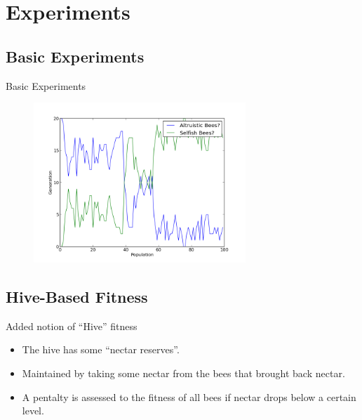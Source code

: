 \documentclass{beamer}
\begin{document}
    \section{Experiments}

    \subsection{Basic Experiments}

    \begin{frame}{Basic Experiments}
        \begin{figure}
            
        \includegraphics[width=8cm]{s_bees.png}
        \end{figure}

    \end{frame}

    \subsection{Hive-Based Fitness}

    \begin{frame}{Added notion of ``Hive'' fitness}
        \begin{itemize}
            \item The hive has some ``nectar reserves''.
            \item Maintained by taking some nectar from the bees that brought back nectar.
            \item A pentalty is assessed to the fitness of all bees if nectar drops below a certain 
                  level.
        \end{itemize}
    \end{frame}
\end{document}
